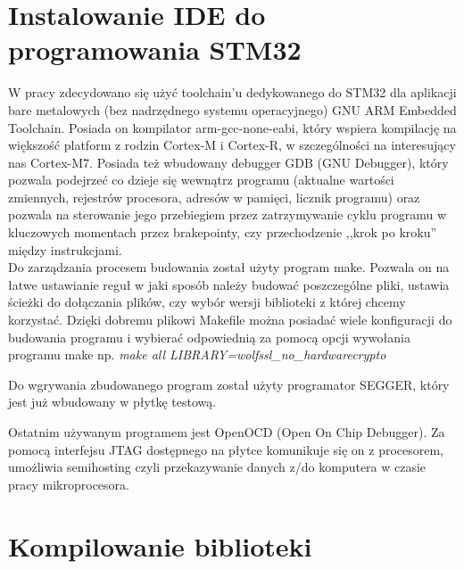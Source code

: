\documentclass[oneside]{mgr}
\begin{document}
\section{Instalowanie IDE do programowania STM32}

W pracy zdecydowano się użyć toolchain'u dedykowanego do STM32 dla aplikacji bare metalowych (bez nadrzędnego systemu operacyjnego) GNU ARM Embedded Toolchain. Posiada on kompilator arm-gcc-none-eabi, który wspiera kompilację na większość platform z rodzin Cortex-M i Cortex-R, w szczególności na interesujący nas Cortex-M7. Posiada też wbudowany debugger GDB (GNU Debugger), który pozwala podejrzeć co dzieje się wewnątrz programu (aktualne wartości zmiennych, rejestrów procesora, adresów w pamięci, licznik programu) oraz pozwala na sterowanie jego przebiegiem przez zatrzymywanie cyklu programu w kluczowych momentach przez brakepointy, czy przechodzenie ,,krok po kroku'' między instrukcjami.\\
Do zarządzania procesem budowania został użyty program make. Pozwala on na łatwe ustawianie reguł w jaki sposób należy budować poszczególne pliki, ustawia ścieżki do dołączania plików, czy wybór wersji biblioteki z której chcemy korzystać. Dzięki dobremu plikowi Makefile można posiadać wiele konfiguracji do budowania programu i wybierać odpowiednią za pomocą opcji wywołania programu make np. \textit{make all LIBRARY=wolfssl\_no\_hardwarecrypto }

Do wgrywania zbudowanego program został użyty programator SEGGER, który jest już wbudowany w płytkę testową.

Ostatnim używanym programem jest OpenOCD (Open On Chip Debugger). Za pomocą interfejsu JTAG dostępnego na płytce komunikuje się on z procesorem, umożliwia semihosting czyli przekazywanie danych z/do komputera w czasie pracy mikroprocesora.

\section{Kompilowanie biblioteki}
\end{document}
